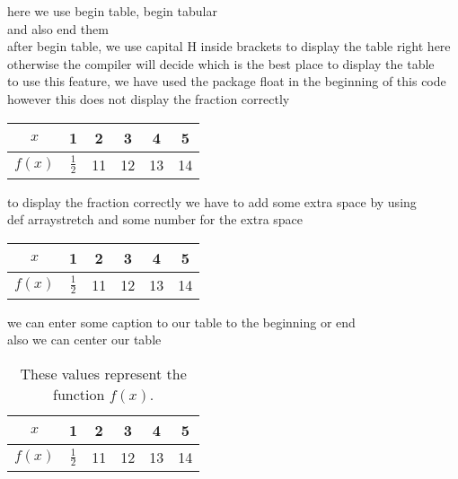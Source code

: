 \documentclass[24pt]{article}
\begin{document}
here we use begin table, begin tabular\\
and also end them\\
after begin table, we use capital H inside brackets to display the table right here\\
otherwise the compiler will decide which is the best place to display the table\\
to use this feature, we have used the package float in the beginning of this code\\
however this does not display the fraction correctly\\
\begin{table}[H]
\begin{tabular}{|c||c|c|c|c|c|}
\hline
$x$ & 1 & 2 & 3 & 4 & 5 \\ \hline
$f(x)$ & $\frac{1}{2}$ & 11 & 12 & 13 & 14 \\ \hline
\end{tabular}
\end{table}


\vspace{1cm}

to display the fraction correctly we have to add some extra space by using\\
def arraystretch and some number for the extra space\\
\begin{table}[H]
\def\arraystretch{1.8}
\begin{tabular}{|c||c|c|c|c|c|}
\hline
$x$ & 1 & 2 & 3 & 4 & 5 \\ \hline
$f(x)$ & $\frac{1}{2}$ & 11 & 12 & 13 & 14 \\ \hline
\end{tabular}
\end{table}


\vspace{1cm}

we can enter some caption to our table to the beginning or end\\
also we can center our table\\
\begin{table}[H]
\centering
\def\arraystretch{1.8}
\begin{tabular}{|c||c|c|c|c|c|}
\hline
$x$ & 1 & 2 & 3 & 4 & 5 \\ \hline
$f(x)$ & $\frac{1}{2}$ & 11 & 12 & 13 & 14 \\ \hline
\end{tabular}
\caption{These values represent the function $f(x)$.}
\end{table}
\end{document}
